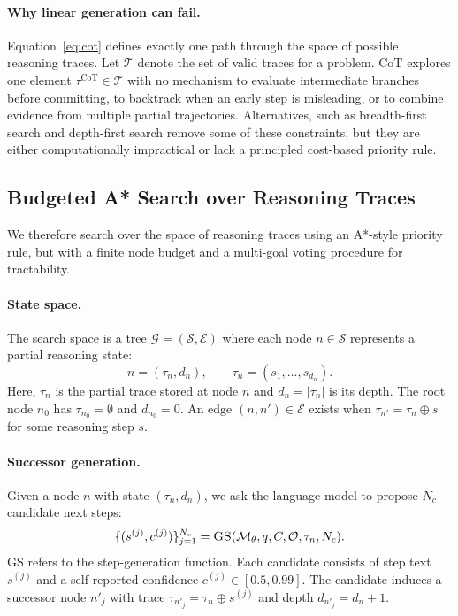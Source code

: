 \documentclass[11pt]{article}
\begin{document}
\paragraph{Why linear generation can fail.}
Equation~\eqref{eq:cot} defines exactly one path through the space of possible reasoning traces. Let $\mathcal{T}$ denote the set of valid traces for a problem. CoT explores one element $\tau^{\text{CoT}} \in \mathcal{T}$ with no mechanism to evaluate intermediate branches before committing, to backtrack when an early step is misleading, or to combine evidence from multiple partial trajectories. Alternatives, such as breadth-first search and depth-first search remove some of these constraints, but they are either computationally impractical or lack a principled cost-based priority rule. 

\subsection{Budgeted A* Search over Reasoning Traces}
\label{sec:astar}

We therefore search over the space of reasoning traces using an A*-style priority rule, but with a finite node budget and a multi-goal voting procedure for tractability.

\paragraph{State space.}
The search space is a tree $\mathcal{G} = (\mathcal{S}, \mathcal{E})$ where each node $n \in \mathcal{S}$ represents a partial reasoning state:
\begin{equation}
n = (\tau_n, d_n), \qquad \tau_n = (s_1, \ldots, s_{d_n}).
\label{eq:state}
\end{equation}
Here, $\tau_n$ is the partial trace stored at node $n$ and $d_n = |\tau_n|$ is its depth. The root node $n_0$ has $\tau_{n_0} = \emptyset$ and $d_{n_0} = 0$. An edge $(n,n') \in \mathcal{E}$ exists when $\tau_{n'} = \tau_n \oplus s$ for some reasoning step $s$.

\paragraph{Successor generation.}
Given a node $n$ with state $(\tau_n, d_n)$, we ask the language model to propose $N_c$ candidate next steps:
\begin{equation}
\{(s^{(j)}, c^{(j)})\}_{j=1}^{N_c} = \textsc{GS}(\mathcal{M}_\theta, q, C, \mathcal{O}, \tau_n, N_c).
\label{eq:successor}
\end{equation}
\textsc{GS} refers to the step-generation function. Each candidate consists of step text $s^{(j)}$ and a self-reported confidence $c^{(j)} \in [0.5,0.99]$. The candidate induces a successor node $n'_j$ with trace $\tau_{n'_j} = \tau_n \oplus s^{(j)}$ and depth $d_{n'_j} = d_n + 1$.
\end{document}
